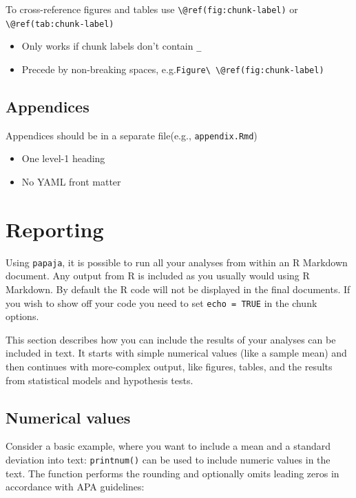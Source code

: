 \documentclass[man,floatsintext]{apa6}
\providecommand{\tightlist}{%
  \setlength{\itemsep}{0pt}\setlength{\parskip}{0pt}}
\theoremstyle{definition}
\theoremstyle{definition}
\theoremstyle{definition}
\theoremstyle{remark}
\begin{document}
To cross-reference figures and tables use
\texttt{\textbackslash{}@ref(fig:chunk-label)} or
\texttt{\textbackslash{}@ref(tab:chunk-label)}

\begin{itemize}
\tightlist
\item
  Only works if chunk labels don't contain \texttt{\_}
\item
  Precede by non-breaking spaces,
  e.g.\texttt{Figure\textbackslash{}\ \textbackslash{}@ref(fig:chunk-label)}
\end{itemize}

\subsection{Appendices}\label{appendices}

Appendices should be in a separate file(e.g., \texttt{appendix.Rmd})

\begin{itemize}
\tightlist
\item
  One level-1 heading
\item
  No YAML front matter
\end{itemize}

\section{Reporting}\label{reporting}

Using \texttt{papaja}, it is possible to run all your analyses from
within an R Markdown document. Any output from R is included as you
usually would using R Markdown. By default the R code will not be
displayed in the final documents. If you wish to show off your code you
need to set \texttt{echo\ =\ TRUE} in the chunk options.

This section describes how you can include the results of your analyses
can be included in text. It starts with simple numerical values (like a
sample mean) and then continues with more-complex output, like figures,
tables, and the results from statistical models and hypothesis tests.

\hypertarget{numerical-values}{\subsection{Numerical
values}\label{numerical-values}}

Consider a basic example, where you want to include a mean and a
standard deviation into text: \texttt{printnum()} can be used to include
numeric values in the text. The function performs the rounding and
optionally omits leading zeros in accordance with APA guidelines:
\end{document}
